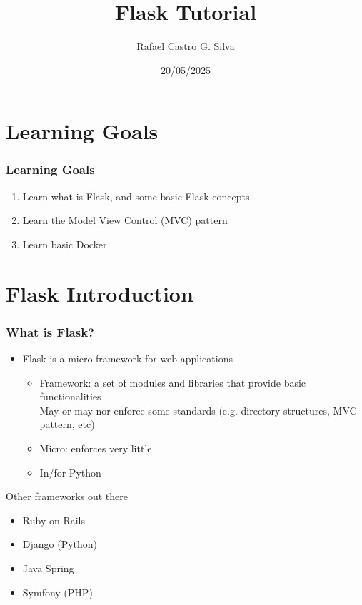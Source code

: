 \documentclass[fleqn,aspectratio=169,10pt]{beamer}
\title[Please open: \url{github.com/rafaelcgs10/dis2025}]{Flask Tutorial}
\author[Rafael Castro]{Rafael Castro G. Silva}
\date{20/05/2025}
\institute[]{
  Department of Computer Science \\
  University of Copenhagen}
\begin{document}

\begin{frame}
  \titlepage
\end{frame}

\section{Learning Goals}

\begin{frame}
  \frametitle{Learning Goals}
  \begin{enumerate}
    \item Learn what is Flask, and some basic Flask concepts
    \item Learn the Model View Control (MVC) pattern
    \item Learn basic Docker
  \end{enumerate}
\end{frame}

\section{Flask Introduction}

\begin{frame}[fragile]
  \frametitle{What is Flask?}
  \begin{itemize}
          \pause
    \item Flask is a micro framework for web applications
          \pause
          \begin{itemize}
            \item Framework: a set of modules and libraries that provide basic functionalities \\
                  May or may nor enforce some standards (e.g. directory structures, MVC pattern, etc)
            \item Micro: enforces very little
            \item In/for Python
          \end{itemize}
  \end{itemize}
  \pause
  \begin{block}{Other frameworks out there}
    \begin{itemize}
      \item Ruby on Rails
      \item Django (Python)
      \item Java Spring
      \item Symfony (PHP)
    \end{itemize}
  \end{block}
\end{frame}
\end{document}
